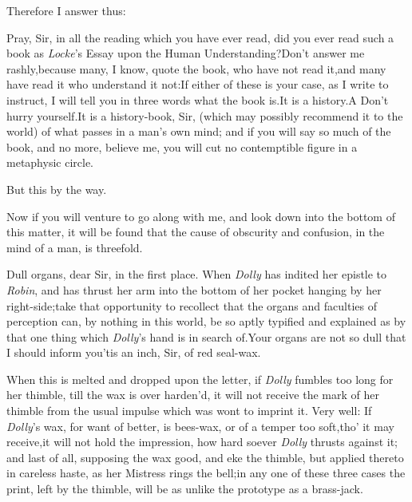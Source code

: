 \documentclass{article}
\begin{document}
\tsh Therefore I answer thus:

Pray, Sir, in all the reading which you have ever read, did you
ever read such a book as \textit{Locke}’s Essay upon the Human
Understanding?\tsh Don’t answer me rashly,\tsk because many, I
know, quote the book, who have not read it,\tsk and many have
read it who understand it not:\tsk If either of these is your
case, as I write to instruct, I will tell you in three words
what the book is.\tsk It is a history.\tsk A\break
{}
Don’t hurry yourself.\tsk It is a
history-book, Sir, (which may possibly recommend it to the
world) of what passes in a man’s own mind; and if you will say
so much of the book, and no more, believe me, you will cut no
contemptible figure in a metaphysic circle.

But this by the way.

Now if you will venture to go along with me, and look down into
the bottom of this matter, it will be found that the cause of
obscurity and confusion, in the mind of a man, is threefold.

Dull organs, dear Sir, in the first place. 
When \textit{Dolly} has indited her epistle to \textit{Robin},
and has thrust her arm into the bottom of her pocket hanging by
her\break
right-side;\tsk take that opportunity to recollect that the
organs and faculties of perception can, by nothing in this
world, be so aptly typified and explained as by that one thing
which \textit{Dolly}’s hand is in search of.\tsk Your organs are
not so dull that I should inform you\tsk ’tis an inch, Sir, of
red seal-wax.

When this is melted and dropped upon the letter, if \textit{Dolly}
fumbles too long for her thimble, till the wax is over harden’d, it
will not receive the mark of her thimble from the usual impulse
which was wont to imprint it. Very well: If \textit{Dolly}’s
wax, for want of better, is bees-wax, or of a temper too
soft,\tsk tho’ it may receive,\tsk it will not hold the
impression, how hard soever \textit{Dolly} thrusts against it; and
last of all, supposing the wax good, and eke the thimble, but
applied thereto in careless haste, as her Mistress rings the bell;\tsh in any one of
these three cases the print, left by the thimble, will be as unlike
the prototype as a brass-jack.
\end{document}
